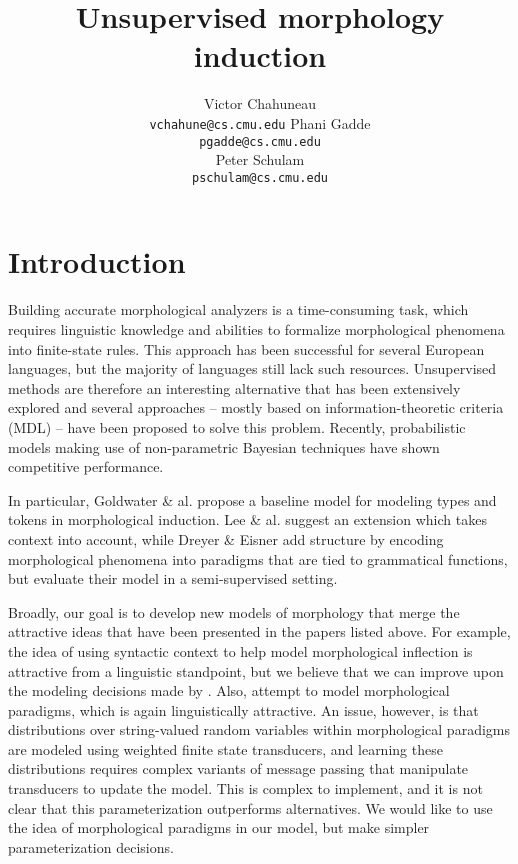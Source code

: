 \documentclass{article}
\title{Unsupervised morphology induction}
\author{
Victor Chahuneau\\
\texttt{vchahune@cs.cmu.edu}
\And
Phani Gadde\\
\texttt{pgadde@cs.cmu.edu} \\
\And
Peter Schulam\\
\texttt{pschulam@cs.cmu.edu}
}
\begin{document}
\maketitle

\section{Introduction}
Building accurate morphological analyzers is a time-consuming task,
which requires linguistic knowledge and abilities to formalize
morphological phenomena into finite-state rules. This approach has
been successful for several European languages, but the majority of
languages still lack such resources. Unsupervised methods are
therefore an interesting alternative that has been extensively
explored and several approaches -- mostly based on
information-theoretic criteria (MDL) -- have been proposed to solve
this problem. Recently, probabilistic models making use of
non-parametric Bayesian techniques have shown competitive performance.

In particular, Goldwater \& al. \cite{goldwater2011} propose a
baseline model for modeling types and tokens in morphological
induction. Lee \& al. \cite{lee2011} suggest an extension which takes
context into account, while Dreyer \& Eisner \cite{dreyer2011} add
structure by encoding morphological phenomena into paradigms that are
tied to grammatical functions, but evaluate their model in a
semi-supervised setting.

Broadly, our goal is to develop new models of morphology that merge
the attractive ideas that have been presented in the papers listed
above. For example, the idea of using syntactic context to help model
morphological inflection is attractive from a linguistic standpoint,
but we believe that we can improve upon the modeling decisions made by
\cite{lee2011}. Also, \cite{dreyer2011} attempt to model morphological
paradigms, which is again linguistically attractive. An issue,
however, is that distributions over string-valued random variables
within morphological paradigms are modeled using weighted finite state
transducers, and learning these distributions requires complex
variants of message passing that manipulate transducers to update the
model. This is complex to implement, and it is not clear that this
parameterization outperforms alternatives. We would like to use the
idea of morphological paradigms in our model, but make simpler
parameterization decisions.
\end{document}
